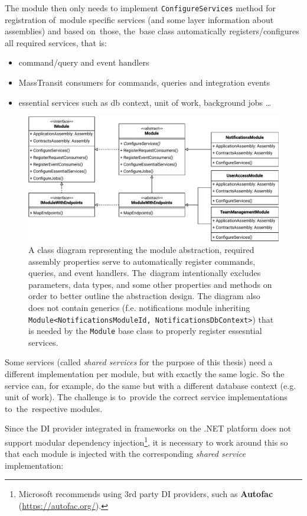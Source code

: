 The module then only needs to implement \texttt{ConfigureServices} method for registration of~module specific services (and some layer information about assemblies) and based on~those, the~base class automatically registers/configures all required services, that is:
\begin{itemize}
    \item command/query and event handlers
    \item MassTransit consumers for commands, queries and integration events
    \item essential services such as db context, unit of work, background jobs \dots
\end{itemize}

\begin{figure} [H]
    \centering
    \includegraphics[width=\textwidth]{figures/cd-modules.pdf}
    \caption{A class diagram representing the module abstraction, required assembly properties serve to automatically register commands, queries, and event handlers. The~diagram intentionally excludes parameters, data types, and some other properties and methods on order to better outline the abstraction design. The diagram also does not contain generics (f.e. notifications module inheriting \texttt{Module<NotificationsModuleId, NotificationsDbContext>}) that is needed by the \texttt{Module} base class to properly register essesntial services.}
    \label{fig:mm_cd_modules}
\end{figure}

Some services (called \textit{shared services} for the purpose of this thesis) need a different implementation per module, but with exactly the same logic. So the service can, for example, do the same but with a different database context (e.g. unit of work). The challenge is to~provide the correct service implementations to~the~respective modules.

Since the DI provider integrated in frameworks on the .NET platform does not support modular dependency injection\footnote{Microsoft recommends using 3rd party DI providers, such as \textbf{Autofac} (\url{https://autofac.org/}).}, it is necessary to work around this so that each module is injected with the corresponding \textit{shared service} implementation:

